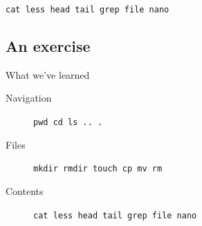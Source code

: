 \begin{frame}[fragile]
  \begin{exercise}
    \begin{center}
      \lstinline[basicstyle=\Large]{cat less head tail grep file nano}
    \end{center}
  \end{exercise}
\end{frame}


\subsection{An exercise}

\begin{frame}
  \begin{block}{What we've learned}
    \begin{description}
      \item[Navigation] \lstinline{pwd cd ls .. .}
      \item[Files] \lstinline{mkdir rmdir touch cp mv rm}
      \item[Contents] \lstinline{cat less head tail grep file nano}
    \end{description}
  \end{block}
\end{frame}



\begin{frame}[allowframebreaks]
  \printbibliography{}
\end{frame}
